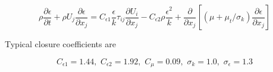 \begin{equation}
    \rho \frac{\partial \epsilon}{\partial t}
    + \rho U_j \frac{\partial \epsilon}{\partial x_j}
    = C_{\epsilon 1} \frac{\epsilon}{k} \tau_{ij}
    \frac{\partial U_i}{\partial x_j}
    - C_{\epsilon 2} \rho \frac{\epsilon^2}{k}
    + \frac{\partial}{\partial x_j}
    \left[
    (\mu + \mu_t/\sigma_k) \frac{\partial \epsilon}{\partial x_j}
    \right]
    \label{eq:kepsilon-epsilon}
\end{equation}

Typical closure coefficients are

\begin{equation}
    C_{\epsilon 1} = 1.44, \, \,
    C_{\epsilon 2} = 1.92, \, \,
    C_\mu = 0.09, \, \,
    \sigma_k = 1.0, \, \,
    \sigma_\epsilon = 1.3
\end{equation}

